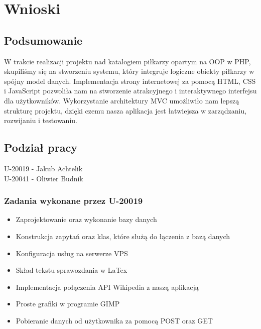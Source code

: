 \section{Wnioski}
    \subsection{Podsumowanie}
    W trakcie realizacji projektu nad katalogiem piłkarzy opartym na OOP w PHP, skupiliśmy się na stworzeniu  systemu, który integruje logiczne obiekty piłkarzy w spójny model danych. Implementacja strony internetowej za pomocą HTML, CSS i JavaScript pozwoliła nam na stworzenie atrakcyjnego i interaktywnego interfejsu dla użytkowników. Wykorzystanie architektury MVC umożliwiło nam lepszą strukturę projektu, dzięki czemu nasza aplikacja jest łatwiejsza w zarządzaniu, rozwijaniu i testowaniu.
    \subsection{Podział pracy}

    U-20019 - Jakub Achtelik\\
    U-20041 - Oliwier Budnik\\

    \subsubsection{Zadania wykonane przez U-20019}
    \begin{itemize}
        \item Zaprojektowanie oraz wykonanie bazy danych
        \item Konstrukcja zapytań oraz klas, które służą do łączenia z bazą danych
        \item Konfiguracja usług na serwerze VPS
        \item Skład tekstu sprawozdania w LaTex
        \item Implementacja połączenia API Wikipedia z naszą aplikacją
        \item Proste grafiki w programie GIMP
        \item Pobieranie danych od użytkownika za pomocą POST oraz GET
    \end{itemize}
